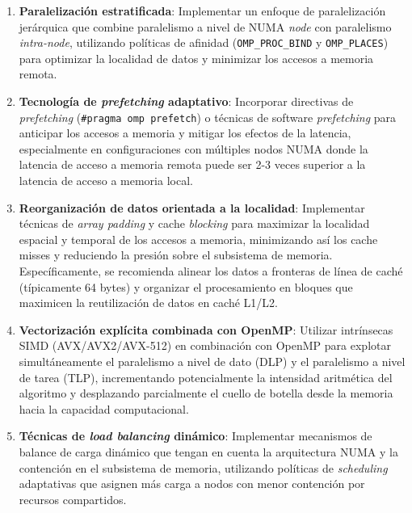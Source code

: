         \begin{enumerate}
        
            \item \textbf{Paralelización estratificada}: Implementar un enfoque de paralelización jerárquica que combine paralelismo a nivel de NUMA \textit{node} con paralelismo \textit{intra-node}, utilizando políticas de afinidad (\texttt{OMP\_PROC\_BIND} y \texttt{OMP\_PLACES}) para optimizar la localidad de datos y minimizar los accesos a memoria remota.
            
            \item \textbf{Tecnología de \textit{prefetching} adaptativo}: Incorporar directivas de \textit{prefetching} (\texttt{\#pragma omp prefetch}) o técnicas de software \textit{prefetching} para anticipar los accesos a memoria y mitigar los efectos de la latencia, especialmente en configuraciones con múltiples nodos NUMA donde la latencia de acceso a memoria remota puede ser 2-3 veces superior a la latencia de acceso a memoria local.
            
            \item \textbf{Reorganización de datos orientada a la localidad}: Implementar técnicas de \textit{array padding} y cache \textit{blocking} para maximizar la localidad espacial y temporal de los accesos a memoria, minimizando así los cache misses y reduciendo la presión sobre el subsistema de memoria. Específicamente, se recomienda alinear los datos a fronteras de línea de caché (típicamente 64 bytes) y organizar el procesamiento en bloques que maximicen la reutilización de datos en caché L1/L2.
            
            \item \textbf{Vectorización explícita combinada con OpenMP}: Utilizar intrínsecas SIMD (AVX/AVX2/AVX-512) en combinación con OpenMP para explotar simultáneamente el paralelismo a nivel de dato (DLP) y el paralelismo a nivel de tarea (TLP), incrementando potencialmente la intensidad aritmética del algoritmo y desplazando parcialmente el cuello de botella desde la memoria hacia la capacidad computacional.
            
            \item \textbf{Técnicas de \textit{load balancing} dinámico}: Implementar mecanismos de balance de carga dinámico que tengan en cuenta la arquitectura NUMA y la contención en el subsistema de memoria, utilizando políticas de \textit{scheduling} adaptativas que asignen más carga a nodos con menor contención por recursos compartidos.
            
        \end{enumerate}
        
